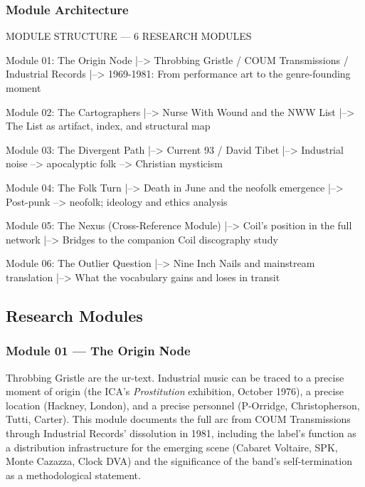 \documentclass[11pt,letterpaper]{article}
\begin{document}
\subsubsection{Module Architecture}

\begin{asciibox}
MODULE STRUCTURE — 6 RESEARCH MODULES

  Module 01: The Origin Node
  |--> Throbbing Gristle / COUM Transmissions / Industrial Records
  |--> 1969-1981: From performance art to the genre-founding moment

  Module 02: The Cartographers
  |--> Nurse With Wound and the NWW List
  |--> The List as artifact, index, and structural map

  Module 03: The Divergent Path
  |--> Current 93 / David Tibet
  |--> Industrial noise --> apocalyptic folk --> Christian mysticism

  Module 04: The Folk Turn
  |--> Death in June and the neofolk emergence
  |--> Post-punk --> neofolk; ideology and ethics analysis

  Module 05: The Nexus (Cross-Reference Module)
  |--> Coil's position in the full network
  |--> Bridges to the companion Coil discography study

  Module 06: The Outlier Question
  |--> Nine Inch Nails and mainstream translation
  |--> What the vocabulary gains and loses in transit
\end{asciibox}

\subsection{Research Modules}

\subsubsection{Module 01 --- The Origin Node}

Throbbing Gristle are the ur-text. Industrial music can be traced to a precise moment of origin
(the ICA's \textit{Prostitution} exhibition, October 1976), a precise location (Hackney, London),
and a precise personnel (P-Orridge, Christopherson, Tutti, Carter). This module documents the
full arc from COUM Transmissions through Industrial Records' dissolution in 1981, including the
label's function as a distribution infrastructure for the emerging scene (Cabaret Voltaire, SPK,
Monte Cazazza, Clock DVA) and the significance of the band's self-termination as a methodological
statement.
\end{document}
